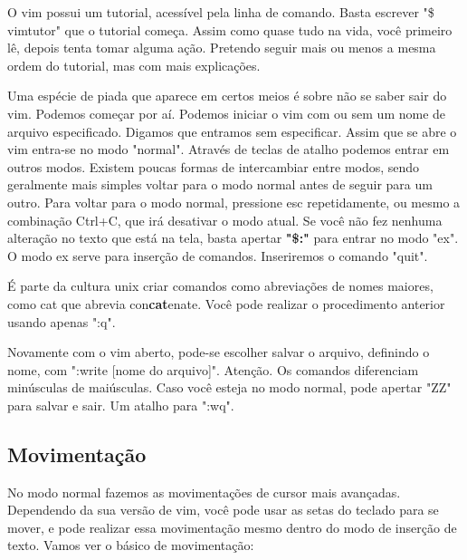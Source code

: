 \documentclass[a4paper, 12pt]{article}
\begin{document}
O vim possui um tutorial, acessível pela linha de comando.
Basta escrever "\$ vimtutor" que o tutorial começa.
Assim como quase tudo na vida, você primeiro lê, depois tenta tomar alguma ação.
Pretendo seguir mais ou menos a mesma ordem do tutorial, mas com mais explicações.

Uma espécie de piada que aparece em certos meios é sobre não se saber sair do vim.
Podemos começar por aí.
Podemos iniciar o vim com ou sem um nome de arquivo especificado.
Digamos que entramos sem especificar.
Assim que se abre o vim entra-se no modo "normal".
Através de teclas de atalho podemos entrar em outros modos.
Existem poucas formas de intercambiar entre modos, sendo geralmente mais simples voltar para o modo normal antes de seguir para um outro.
Para voltar para o modo normal, pressione esc repetidamente, ou mesmo a combinação Ctrl+C, que irá desativar o modo atual.
Se você não fez nenhuma alteração no texto que está na tela, basta apertar \textbf{"\$:"} para entrar no modo "ex".
O modo ex serve para inserção de comandos.
Inseriremos o comando "quit".
 
É parte da cultura unix criar comandos como abreviações de nomes maiores, como cat que abrevia con\textbf{cat}enate.
Você pode realizar o procedimento anterior usando apenas ":q".

Novamente com o vim aberto, pode-se escolher salvar o arquivo, definindo o nome, com ":write [nome do arquivo]".
Atenção. Os comandos diferenciam minúsculas de maiúsculas.
Caso você esteja no modo normal, pode apertar "ZZ" para salvar e sair. Um atalho para ":wq".


\subsection{Movimentação}
No modo normal fazemos as movimentações de cursor mais avançadas.
Dependendo da sua versão de vim, você pode usar as setas do teclado para se mover, e pode realizar essa movimentação mesmo dentro do modo de inserção de texto.
Vamos ver o básico de movimentação:

\end{document}
